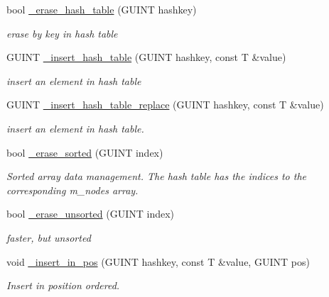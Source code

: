 \begin{DoxyCompactItemize}
bool \hyperlink{classgim__hash__table_af03ef67dcf7b0e805e34df6a5de4425f}{\+\_\+erase\+\_\+hash\+\_\+table} (G\+U\+I\+NT hashkey)
\begin{DoxyCompactList}\small\item\em erase by key in hash table \end{DoxyCompactList}\item 
G\+U\+I\+NT \hyperlink{classgim__hash__table_a4339a279d721d1e687b8d8063332bac8}{\+\_\+insert\+\_\+hash\+\_\+table} (G\+U\+I\+NT hashkey, const T \&value)
\begin{DoxyCompactList}\small\item\em insert an element in hash table \end{DoxyCompactList}\item 
G\+U\+I\+NT \hyperlink{classgim__hash__table_a6ebfb7415bd946855ec5730651f7c191}{\+\_\+insert\+\_\+hash\+\_\+table\+\_\+replace} (G\+U\+I\+NT hashkey, const T \&value)
\begin{DoxyCompactList}\small\item\em insert an element in hash table. \end{DoxyCompactList}\item 
\mbox{\label{classgim__hash__table_ae347a062b1b5907b81127e6bacbbb10e}} 
bool \hyperlink{classgim__hash__table_ae347a062b1b5907b81127e6bacbbb10e}{\+\_\+erase\+\_\+sorted} (G\+U\+I\+NT index)
\begin{DoxyCompactList}\small\item\em Sorted array data management. The hash table has the indices to the corresponding m\+\_\+nodes array. \end{DoxyCompactList}\item 
\mbox{\label{classgim__hash__table_a0b68afa191499a10ac7d7c34230a7d89}} 
bool \hyperlink{classgim__hash__table_a0b68afa191499a10ac7d7c34230a7d89}{\+\_\+erase\+\_\+unsorted} (G\+U\+I\+NT index)
\begin{DoxyCompactList}\small\item\em faster, but unsorted \end{DoxyCompactList}\item 
void \hyperlink{classgim__hash__table_a3eacaf88e1b18815c0b89d368d77a93a}{\+\_\+insert\+\_\+in\+\_\+pos} (G\+U\+I\+NT hashkey, const T \&value, G\+U\+I\+NT pos)
\begin{DoxyCompactList}\small\item\em Insert in position ordered. \end{DoxyCompactList}\item 

\end{DoxyCompactItemize}
